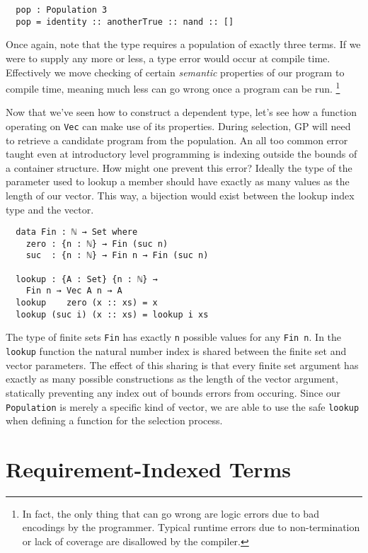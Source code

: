 \documentclass{acm_proc_article-sp}
\begin{document}
\begin{verbatim}
  pop : Population 3
  pop = identity :: anotherTrue :: nand :: []
\end{verbatim}

Once again, note that the type requires a population of exactly three
terms. If we were to supply any more or less, a type error would occur at
compile time. Effectively we move checking of certain \textit{semantic}
properties of our program to compile time, meaning much less can go
wrong once a program can be run.
\footnote{In fact, the only thing
  that can go wrong are logic errors due to bad encodings by the
  programmer. Typical runtime errors due to non-termination or lack of
  coverage are disallowed by the compiler.}

Now that we've seen how to construct a dependent type, let's see how
a function operating on \texttt{Vec} can make use of its properties.
During selection, GP will need to retrieve a candidate program from
the population. An all too common error taught even at introductory
level programming is indexing outside the bounds of a container
structure. How might one prevent this error? Ideally the type of the
parameter used to lookup a member should have exactly as many values
as the length of our vector. This way, a bijection would exist between
the lookup index type and the vector.

\begin{verbatim}
  data Fin : ℕ → Set where
    zero : {n : ℕ} → Fin (suc n)
    suc  : {n : ℕ} → Fin n → Fin (suc n)

  lookup : {A : Set} {n : ℕ} →
    Fin n → Vec A n → A
  lookup    zero (x :: xs) = x
  lookup (suc i) (x :: xs) = lookup i xs
\end{verbatim}

The type of finite sets \texttt{Fin} has exactly \texttt{n} possible
values for any \texttt{Fin n}. In the \texttt{lookup} function the
natural number index is shared between the finite set and vector
parameters. The effect of this sharing is that every finite set
argument has exactly as many possible constructions as the length of
the vector argument, statically preventing any index out of bounds
errors from occuring. Since our \texttt{Population} is merely a
specific kind of vector, we are able to use the safe \texttt{lookup}
when defining a function for the selection process.

\section{Requirement-Indexed Terms}
\end{document}
